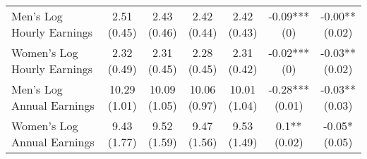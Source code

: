 \begin{landscape}
\begin{ThreePartTable}
\begin{longtable}[t]{>{\raggedright\arraybackslash}p{5cm}cccccc}
\hspace{1em}Men’s Log Hourly Earnings & \specialcell{2.51\\(0.45)} & \specialcell{2.43\\(0.46)} & \specialcell{2.42\\(0.44)} & \specialcell{2.42\\(0.43)} & \specialcell{-0.09***\\(0)} & \specialcell{-0.00**\\(0.02)}\\
\hspace{1em}Women’s Log Hourly Earnings & \specialcell{2.32\\(0.49)} & \specialcell{2.31\\(0.45)} & \specialcell{2.28\\(0.45)} & \specialcell{2.31\\(0.42)} & \specialcell{-0.02***\\(0)} & \specialcell{-0.03**\\(0.02)}\\
\hspace{1em}Men’s Log Annual Earnings & \specialcell{10.29\\(1.01)} & \specialcell{10.09\\(1.05)} & \specialcell{10.06\\(0.97)} & \specialcell{10.01\\(1.04)} & \specialcell{-0.28***\\(0.01)} & \specialcell{-0.03**\\(0.03)}\\
\hspace{1em}Women’s Log Annual Earnings & \specialcell{9.43\\(1.77)} & \specialcell{9.52\\(1.59)} & \specialcell{9.47\\(1.56)} & \specialcell{9.53\\(1.49)} & \specialcell{0.1**\\(0.02)} & \specialcell{-0.05*\\(0.05)}\\*
\end{longtable}
\end{ThreePartTable}
\end{landscape}
